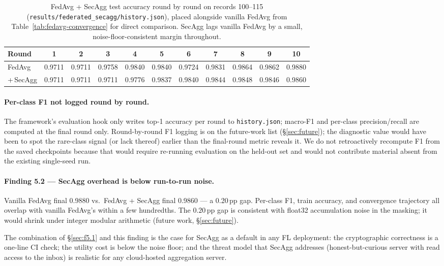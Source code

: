 \documentclass[11pt,a4paper]{report}
\begin{document}
\begin{table}[h]
  \centering
  \caption{FedAvg + SecAgg test accuracy round by round on records
  100--115 (\texttt{results/federated\_secagg/history.json}), placed
  alongside vanilla FedAvg from Table~\ref{tab:fedavg-convergence} for
  direct comparison. SecAgg lags vanilla FedAvg by a small,
  noise-floor-consistent margin throughout.}
  \label{tab:secagg-convergence}
  \begin{tabular}{lcccccccccc}
    \toprule
    Round & 1 & 2 & 3 & 4 & 5 & 6 & 7 & 8 & 9 & 10 \\
    \midrule
    FedAvg                & 0.9711 & 0.9711 & 0.9758 & 0.9840 & 0.9840 & 0.9724 & 0.9831 & 0.9864 & 0.9862 & 0.9880 \\
    +\,SecAgg             & 0.9711 & 0.9711 & 0.9711 & 0.9776 & 0.9837 & 0.9840 & 0.9844 & 0.9848 & 0.9846 & 0.9860 \\
    \bottomrule
  \end{tabular}
\end{table}

\paragraph{Per-class F1 not logged round by round.}
The framework's evaluation hook only writes top-1 accuracy per round to
\texttt{history.json}; macro-F1 and per-class precision/recall are
computed at the final round only. Round-by-round F1 logging is on the
future-work list (\S\ref{sec:future}); the diagnostic value would have
been to spot the rare-class signal (or lack thereof) earlier than the
final-round metric reveals it. We do not retroactively recompute F1 from
the saved checkpoints because that would require re-running evaluation
on the held-out set and would not contribute material absent from the
existing single-seed run.

\paragraph{Finding 5.2 --- SecAgg overhead is below run-to-run noise.}
Vanilla FedAvg final 0.9880 vs.\ FedAvg + SecAgg final 0.9860 ---
a 0.20\,pp gap.
Per-class F1, train accuracy, and convergence trajectory all overlap
with vanilla FedAvg's within a few hundredths.
The $0.20\,\mathrm{pp}$ gap is consistent with float32 accumulation noise
in the masking; it would shrink under integer modular arithmetic
(future work, \S\ref{sec:future}).

The combination of \S\ref{sec:f5.1} and this finding is the case for
SecAgg as a default in any FL deployment: the cryptographic
correctness is a one-line CI check; the utility cost is below the noise
floor; and the threat model that SecAgg addresses (honest-but-curious
server with read access to the inbox) is realistic for any cloud-hosted
aggregation server.
\end{document}
